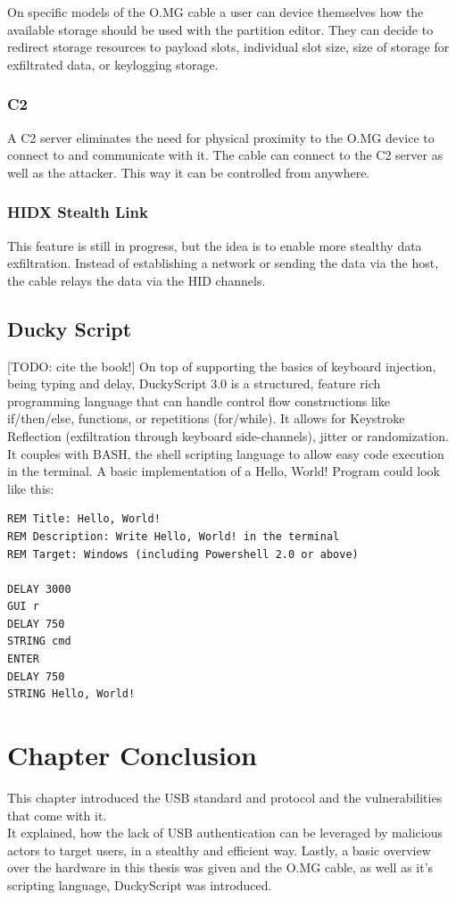 On specific models of the O.MG cable a user can device themselves how the available storage should be used with the partition editor. They can decide to redirect storage resources to payload slots, individual slot size, size of storage for exfiltrated data, or keylogging storage. 

\subsubsection{C2}
A C2 server eliminates the need for physical proximity to the O.MG device to connect to and communicate with it. The cable can connect to the C2 server as well as the attacker. This way it can be controlled from anywhere. 

\subsubsection{HIDX Stealth Link}
This feature is still in progress, but the idea is to enable more stealthy data exfiltration. Instead of establishing a network or sending the data via the host, the cable relays the data via the HID channels.  


\subsection{Ducky Script} \label{DuckyScript}

[TODO: cite the book!]
On top of supporting the basics of keyboard injection, being typing and delay, DuckyScript 3.0 is a structured, feature rich programming language that can handle control flow constructions like if/then/else, functions, or repetitions (for/while). It allows for Keystroke Reflection (exfiltration through keyboard side-channels), jitter or randomization. It couples with BASH, the shell scripting language to allow easy code execution in the terminal. A basic implementation of a Hello, World! Program could look like this:

\begin{verbatim}
REM Title: Hello, World!
REM Description: Write Hello, World! in the terminal
REM Target: Windows (including Powershell 2.0 or above)

DELAY 3000
GUI r
DELAY 750
STRING cmd
ENTER
DELAY 750
STRING Hello, World!

\end{verbatim}


\section{Chapter Conclusion}

This chapter introduced the USB standard and protocol and the vulnerabilities that come with it. \\
It explained, how the lack of USB authentication can be leveraged by malicious actors to target users, in a stealthy and efficient way. 
Lastly, a basic overview over the hardware in this thesis was given and the O.MG cable, as well as it's scripting language, DuckyScript was introduced. 